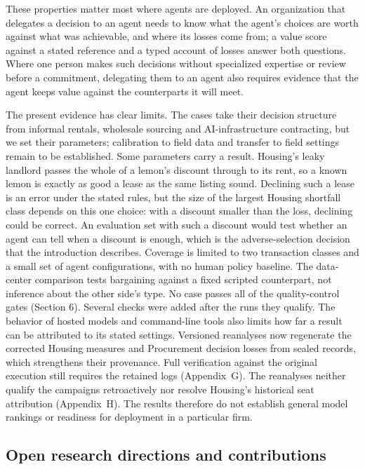 These properties matter most where agents are deployed. An organization
that delegates a decision to an agent needs to know what the agent's
choices are worth against what was achievable, and where its losses come
from; a value score against a stated reference and a typed account of
losses answer both questions. Where one person makes such decisions
without specialized expertise or review before a commitment, delegating
them to an agent also requires evidence that the agent keeps value against
the counterparts it will meet.

The present evidence has clear limits. The cases take their decision
structure from informal rentals, wholesale sourcing and AI-infrastructure
contracting, but we set their parameters; calibration to
field data and transfer to field settings remain to be established.
Some parameters carry a result. Housing's leaky landlord passes the whole of a
lemon's discount through to its rent, so a known lemon is exactly as good a
lease as the same listing sound. Declining such a lease is an error under the
stated rules, but the size of the largest Housing shortfall class depends on
this one choice: with a discount smaller than the loss, declining could be
correct. An evaluation set with such a discount would test whether an agent can
tell when a discount is enough, which is the adverse-selection decision that
the introduction describes.
Coverage is limited to two transaction classes and a small set of agent
configurations, with no human policy baseline. The data-center comparison tests bargaining
against a fixed scripted counterpart, not inference about the other side's type. No case passes all of the
quality-control gates (Section 6). Several checks were added after the runs
they qualify. The behavior of hosted models and command-line tools also limits
how far a result can be attributed to its stated settings.
Versioned reanalyses now regenerate the corrected Housing measures and
Procurement decision losses from sealed records, which strengthens their
provenance. Full verification against the original execution still
requires the retained logs (Appendix~G). The reanalyses neither qualify the
campaigns retroactively nor resolve Housing's historical seat attribution
(Appendix~H). The results therefore do not establish general model rankings
or readiness for deployment in a particular firm.

\subsection{Open research directions and contributions}
\label{sec:open-directions}

